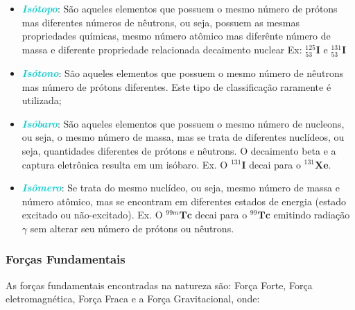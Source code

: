 \documentclass[11pt,a4paper]{article}
\begin{document}
    \begin{itemize}
        \item \textbf{\textit{\textcolor{DarkTurquoise}{Isótopo}}}: São aqueles elementos que possuem o mesmo número de prótons mas diferentes números de nêutrons, ou seja, possuem as mesmas propriedades químicas, mesmo número atômico mas diferênte número de massa e diferente propriedade relacionada decaimento nuclear Ex:  $ {}_{53}^{125} \mathbf{I} $ e $ {}_{53}^{131} \mathbf{I} $
        \item \textbf{\textit{\textcolor{DarkTurquoise}{Isótono}}}: São aqueles elementos que possuem o mesmo número de nêutrons mas número de prótons diferentes. Este tipo de classificação raramente é utilizada;
        \item \textbf{\textit{\textcolor{DarkTurquoise}{Isóbaro}}}: São aqueles elementos que possuem o mesmo número de nucleons, ou seja, o mesmo número de massa, mas se trata de diferentes nuclídeos, ou seja, quantidades diferentes de prótons e nêutrons. O decaimento beta e a captura eletrônica resulta em um isóbaro. Ex. O ${}^{131} \mathbf{I}$ decai para o ${}^{131} \mathbf{Xe}$.
        \item \textbf{\textit{\textcolor{DarkTurquoise}{Isômero}}}: Se trata do mesmo nuclídeo, ou seja, mesmo número de massa e número atômico, mas se encontram em diferentes estados de energia (estado excitado ou não-excitado). Ex. O ${}^{99m} \mathbf{Tc}$ decai para o ${}^{99} \mathbf{Tc}$ emitindo radiação $\gamma$ sem alterar seu número de prótons ou nêutrons.
    \end{itemize}

        
\subsubsection*{Forças Fundamentais}

    As forças fundamentais encontradas na natureza são: Força Forte, Força eletromagnética, Força Fraca e a Força Gravitacional, onde:
\end{document}
